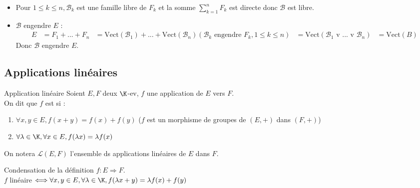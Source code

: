 \documentclass[12pt, a4paper]{report}
\begin{document}
\begin{demo}{}
\begin{itemize}
	\item Pour $1 \le k \le n, \mathcal{B}_k$ est une famille libre de $F_k$ et la somme $\displaystyle{\sum_{k=1}^n F_k}$ est directe donc $\mathcal{B}$ est libre. 
	\item $\mathcal{B}$ engendre $E$ : 
	\begin{align*}
	E &= F_1 + ... + F_n
	&= \text{Vect}(\mathcal{B}_1) + ... + \text{Vect}(\mathcal{B}_n) ( \mathcal{B}_k \text{ engendre } F_k, 1 \le k \le n)
	&= \text{Vect}(\mathcal{B}_1 \text{ v } ... \text{ v } \mathcal{B}_n)
	&= \text{Vect}(B)
	\end{align*}
	Donc $\mathcal{B}$ engendre $E$.
\end{itemize}
\end{demo}


\subsection{Applications linéaires}

\begin{definition}{Application linéaire}{}
Soient $E,F$ deux $\K$-ev, $f$ une application de $E$ vers $F$. \\
On dit que $f$ est  si :
\begin{enumerate}
	\item $\forall x,y \in E, f(x+y) = f(x)+f(y)$ ($f$ est un morphisme de groupes de $(E,+)$ dans $(F,+)$)
	\item $\forall \lambda \in \K, \forall x \in E, f(\lambda x) = \lambda f(x)$
\end{enumerate}
\end{definition}

\begin{remarque}[Notation]{}
On notera $\mathcal{L}(E,F)$ l'ensemble ds applications linéaires de $E$ dans $F$.
\end{remarque}

\begin{proposition}{Condensation de la définition}{}
$f : E \Longrightarrow F$. \\
$f$ linéaire $\Longleftrightarrow \forall x,y \in E, \forall \lambda \in \K, f(\lambda x + y) = \lambda f(x) + f(y)$
\end{proposition}
\end{document}
